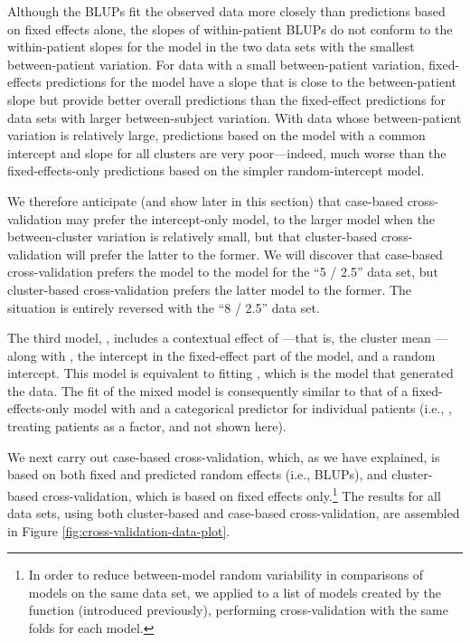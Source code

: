 \documentclass[
]{jss}
\begin{document}
Although the BLUPs fit the observed data more closely than predictions
based on fixed effects alone, the slopes of within-patient BLUPs do not
conform to the within-patient slopes for the  model in the
two data sets with the smallest between-patient variation. For data with
a small between-patient variation, fixed-effects predictions for the
 model have a slope that is close to the between-patient
slope but provide better overall predictions than the fixed-effect
predictions for data sets with larger between-subject variation. With
data whose between-patient variation is relatively large, predictions
based on the model with a common intercept and slope for all clusters
are very poor---indeed, much worse than the fixed-effects-only
predictions based on the simpler random-intercept model.

We therefore anticipate (and show later in this section) that case-based
cross-validation may prefer the intercept-only model,  to the
larger  model when the between-cluster variation is
relatively small, but that cluster-based cross-validation will prefer
the latter to the former. We will discover that case-based
cross-validation prefers the  model to the 
model for the ``5 / 2.5'' data set, but cluster-based cross-validation
prefers the latter model to the former. The situation is entirely
reversed with the ``8 / 2.5'' data set.

The third model, , includes a contextual effect of
---that is, the cluster mean ---along with ,
the intercept in the fixed-effect part of the model, and a random
intercept. This model is equivalent to fitting
, which is the model that
generated the data. The fit of the mixed model  is
consequently similar to that of a fixed-effects-only model with 
and a categorical predictor for individual patients (i.e.,
, treating patients as a factor, and not
shown here).

We next carry out case-based cross-validation, which, as we have
explained, is based on both fixed and predicted random effects (i.e.,
BLUPs), and cluster-based cross-validation, which is based on fixed
effects only.\footnote{In order to reduce between-model random
  variability in comparisons of models on the same data set, we applied
   to a list of models created by the 
  function (introduced previously), performing cross-validation with the
  same folds for each model.} The results for all data sets, using both
cluster-based and case-based cross-validation, are assembled in Figure
\ref{fig:cross-validation-data-plot}.
\end{document}
